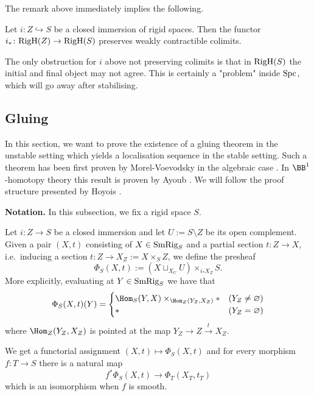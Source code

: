 \documentclass[colorinlistoftodos,article,11pt,reqno]{article}
\newcommand{\RigH}{\textup{RigH}}
\newcommand{\SmRig}{\textup{SmRig}}
\newcommand{\Spc}{\textup{Spc}}
\newcommand{\Brig}{\BB^{1}}
\renewcommand{\to}[1][]{\overset{#1}{\rightarrow}}
\newcommand{\To}[1][]{\overset{#1}{\longrightarrow}}
\newcommand{\inj}[1][]{\overset{#1}{\hookrightarrow}}		%
\begin{document}
The remark above immediately implies the following.

\begin{cor} \label{cor-i_*-preserves-colimits}
Let $i\colon Z\inj S$ be a closed immersion of rigid spaces. Then the functor $i_* \colon \RigH(Z) \to \RigH(S)$ preserves weakly contractible colimits.
\end{cor}

The only obstruction for $i$ above not preserving colimits is that in $\RigH(S)$ the initial and final object may not agree. This is certainly a "problem" inside $\Spc$, which will go away after stabilising. 

\subsection{Gluing}
In this section, we want to prove the existence of a
gluing theorem in the unstable setting which yields a localisation sequence in the stable setting. Such a theorem has been first proven by Morel-Voevodsky in the algebraic case \cite[Thm.~2.21]{MV1}.  In $\Brig$-homotopy theory this result is proven by Ayoub \cite{AyoubRig}. We will follow the proof structure presented by Hoyois \cite[\S 4]{Hoy-EQ}.

\vspace{6pt}\noindent\textbf{Notation.} In this subsection, we fix a rigid space $S$. 

\begin{defi} \label{def-phi-presheaf}
Let $i\colon Z\to S$ be a closed immersion and let $U:=S\setminus Z$ be its open complement. Given a pair $(X,t)$ consisting of $X\in\SmRig_S$ and a partial section $t\colon Z\to X$, i.e.\ inducing a section $t\colon Z\to X_Z := X\times_SZ$, we define the presheaf
\[ \Phi_S(X,t) := (X\sqcup_{X_U}U) \times_{i_*X_Z} S. \]
More explicitly, evaluating at $Y\in\SmRig_S$ we have that
\begin{align*}
\Phi_S(X,t)(Y) = \begin{cases} \Hom_S(Y,X)\times_{\Hom_Z(Y_Z,X_Z)}* & (Y_Z\neq\varnothing) \\ * & (Y_Z=\varnothing) \end{cases}
\end{align*}
where $\Hom_Z(Y_Z,X_Z)$ is pointed at the map $Y_Z \to Z \to[t] X_Z$. 
\end{defi}

\begin{rem}
We get a functorial assignment $(X,t) \mapsto \Phi_S(X,t)$ and for every morphism $f\colon T\to S$ there is a natural map 
\[ f^*\Phi_S(X,t) \To \Phi_T(X_T,t_T) \]
which is an isomorphism when $f$ is smooth.
\end{rem}
\end{document}
